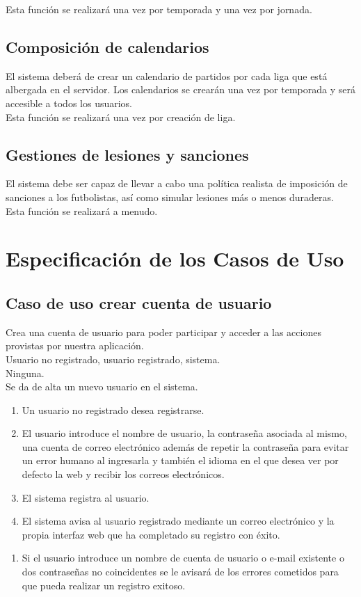 Esta función se realizará una vez por temporada y una vez por jornada.

\subsection{Composición de calendarios}
El sistema deberá de crear un calendario de partidos por cada liga que
está albergada en el servidor. Los calendarios se crearán una vez por
temporada y será accesible a todos los usuarios.\\

Esta función se realizará una vez por creación de liga.
\subsection{Gestiones de lesiones y sanciones}
El sistema debe ser capaz de llevar a cabo una política realista de
imposición de sanciones a los futbolistas, así como simular lesiones
más o menos duraderas.\\

Esta función se realizará a menudo.

\section{Especificación de los Casos de Uso}
\subsection{Caso de uso crear cuenta de usuario}
 Crea una cuenta de usuario para poder 
participar y acceder a las acciones provistas por nuestra aplicación.\\
 Usuario no registrado, usuario registrado,
sistema. \\
 Ninguna. \\
 Se da de alta un nuevo usuario en el
sistema. \\
\begin{enumerate}
  \item Un usuario no registrado desea registrarse.
  \item El usuario introduce el nombre de usuario, la contraseña
    asociada al mismo, una cuenta de correo electrónico además de repetir la contraseña para evitar un
    error humano al ingresarla y también el idioma en el que desea ver
    por defecto la web y recibir los correos electrónicos.
  \item El sistema registra al usuario.
  \item El sistema avisa al usuario registrado mediante un correo
    electrónico y la propia interfaz web que ha completado su registro con éxito.
\end{enumerate}
\begin{enumerate}
  \item Si el usuario introduce un nombre de cuenta de usuario o e-mail
    existente o dos contraseñas no coincidentes se le avisará de los errores cometidos
    para que pueda realizar un registro exitoso.
\end{enumerate}

